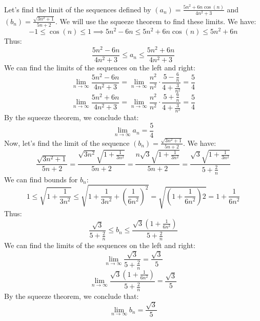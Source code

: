 \begin{eg}
    Let's find the limit of the sequences defined by $(a_n) = \frac{5n^2 + 6n \cos (n)}{4n^2 + 3}$ and $(b_n) = \frac{\sqrt{3n^2 + 1}}{5n + 2}$. We will use the squeeze theorem to find these limits. We have:
    \[ -1 \leq \cos(n) \leq 1 \implies 5n^2 - 6n \leq 5n^2 + 6n \cos(n) \leq 5n^2 + 6n \]
    Thus:
    \[ \frac{5n^2 - 6n}{4n^2 + 3} \leq a_n \leq \frac{5n^2 + 6n}{4n^2 + 3} \]
    We can find the limits of the sequences on the left and right:
    \[ \lim_{n \to \infty} \frac{5n^2 - 6n}{4n^2 + 3} = \lim_{n \to \infty} \frac{n^2}{n^2} \cdot \frac{5 - \frac{6}{n}}{4 + \frac{3}{n^2}} = \frac{5}{4} \]
    \[ \lim_{n \to \infty} \frac{5n^2 + 6n}{4n^2 + 3} = \lim_{n \to \infty} \frac{n^2}{n^2} \cdot \frac{5 + \frac{6}{n}}{4 + \frac{3}{n^2}} = \frac{5}{4} \]
    By the squeeze theorem, we conclude that:
    \[ \lim_{n \to \infty} a_n = \frac{5}{4} \]
    Now, let's find the limit of the sequence \( (b_n) = \frac{\sqrt{3n^2 + 1}}{5n + 2} \). We have:
    \[
        \frac{\sqrt{3n^2 + 1}}{5n + 2} = \frac{\sqrt{3n^2} \sqrt{1 + \frac{1}{3n^2}}}{5n + 2} = \frac{n \sqrt{3} \sqrt{1 + \frac{1}{3n^2}}}{5n + 2} = \frac{\sqrt{3} \sqrt{1 + \frac{1}{3n^2}}}{5 + \frac{2}{n}}
    \]
    We can find bounds for \( b_n \):
    \[
        1 \leq \sqrt{1 + \frac{1}{3n^2}} \leq \sqrt{1 + \frac{1}{3n^2} + (\frac{1}{6n^2})^2} = \sqrt{(1 + \frac{1}{6n^2})2} = 1 + \frac{1}{6n^2}
    \]
    Thus:
    \[ \frac{\sqrt{3}}{5 + \frac{2}{n}} \leq b_n \leq \frac{\sqrt{3}(1 + \frac{1}{6n^2})}{5 + \frac{2}{n}} \]
    We can find the limits of the sequences on the left and right:
    \[ \lim_{n \to \infty} \frac{\sqrt{3}}{5 + \frac{2}{n}} = \frac{\sqrt{3}}{5} \]
    \[ \lim_{n \to \infty} \frac{\sqrt{3}(1 + \frac{1}{6n^2})}{5 + \frac{2}{n}} = \frac{\sqrt{3}}{5} \]
    By the squeeze theorem, we conclude that:
    \[ \lim_{n \to \infty} b_n = \frac{\sqrt{3}}{5} \]
\end{eg}
